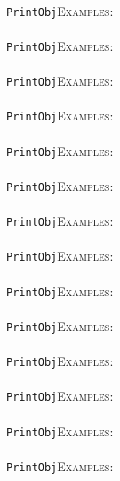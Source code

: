 \documentclass[a4paper,11pt]{report}
\begin{document}
{{ \\
 \texttt{PrintObj}{\nobreakspace}{\nobreakspace}{\nobreakspace}{\nobreakspace}\textsc{Examples:} \\
 \\
 \texttt{PrintObj}{\nobreakspace}{\nobreakspace}{\nobreakspace}{\nobreakspace}\textsc{Examples:} \\
 \\
 \texttt{PrintObj}{\nobreakspace}{\nobreakspace}{\nobreakspace}{\nobreakspace}\textsc{Examples:} \\
 \\
 \texttt{PrintObj}{\nobreakspace}{\nobreakspace}{\nobreakspace}{\nobreakspace}\textsc{Examples:} \\
 \\
 \texttt{PrintObj}{\nobreakspace}{\nobreakspace}{\nobreakspace}{\nobreakspace}\textsc{Examples:} \\
 \\
 \texttt{PrintObj}{\nobreakspace}{\nobreakspace}{\nobreakspace}{\nobreakspace}\textsc{Examples:} \\
 \\
 \texttt{PrintObj}{\nobreakspace}{\nobreakspace}{\nobreakspace}{\nobreakspace}\textsc{Examples:} \\
 \\
 \texttt{PrintObj}{\nobreakspace}{\nobreakspace}{\nobreakspace}{\nobreakspace}\textsc{Examples:} \\
 \\
 \texttt{PrintObj}{\nobreakspace}{\nobreakspace}{\nobreakspace}{\nobreakspace}\textsc{Examples:} \\
 \\
 \texttt{PrintObj}{\nobreakspace}{\nobreakspace}{\nobreakspace}{\nobreakspace}\textsc{Examples:} \\
 \\
 \texttt{PrintObj}{\nobreakspace}{\nobreakspace}{\nobreakspace}{\nobreakspace}\textsc{Examples:} \\
 \\
 \texttt{PrintObj}{\nobreakspace}{\nobreakspace}{\nobreakspace}{\nobreakspace}\textsc{Examples:} \\
 \\
 \texttt{PrintObj}{\nobreakspace}{\nobreakspace}{\nobreakspace}{\nobreakspace}\textsc{Examples:} \\
 \\
 \texttt{PrintObj}{\nobreakspace}{\nobreakspace}{\nobreakspace}{\nobreakspace}\textsc{Examples:} \\
 \\
}}
\end{document}

